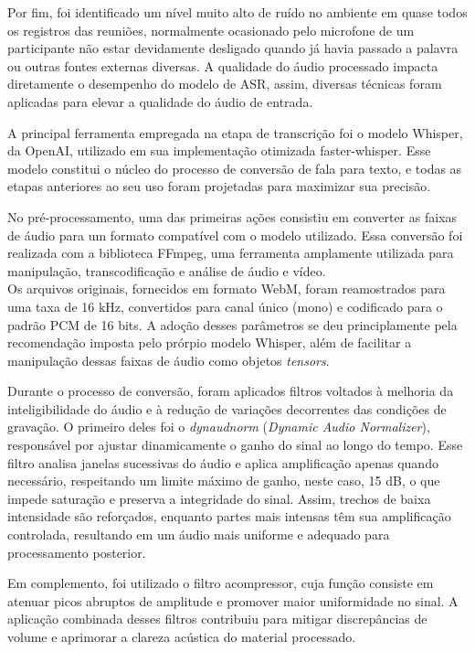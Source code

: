 Por fim, foi identificado um nível muito alto de ruído no ambiente em quase todos os registros das reuniões, normalmente ocasionado pelo microfone de um participante não estar devidamente desligado quando já havia passado a palavra ou outras fontes externas diversas. A qualidade do áudio processado impacta diretamente o desempenho do modelo de ASR, assim, diversas técnicas foram aplicadas para elevar a qualidade do áudio de entrada.

A principal ferramenta empregada na etapa de transcrição foi o modelo Whisper, da OpenAI, utilizado em sua implementação otimizada faster-whisper. Esse modelo constitui o núcleo do processo de conversão de fala para texto, e todas as etapas anteriores ao seu uso foram projetadas para maximizar sua precisão.

No pré-processamento, uma das primeiras ações consistiu em converter as faixas de áudio para um formato compatível com o modelo utilizado. Essa conversão foi realizada com a biblioteca FFmpeg, uma ferramenta amplamente utilizada para manipulação, transcodificação e análise de áudio e vídeo. \\ 

Os arquivos originais, fornecidos em formato WebM, foram reamostrados para uma taxa de 16 kHz, convertidos para canal único (mono) e codificado para o padrão PCM de 16 bits. A adoção desses parâmetros se deu principlamente pela recomendação imposta pelo prórpio modelo Whisper, além de facilitar a manipulação dessas faixas de áudio como objetos \textit{tensors}.

Durante o processo de conversão, foram aplicados filtros voltados à melhoria da inteligibilidade do áudio e à redução de variações decorrentes das condições de gravação. O primeiro deles foi o \textit{dynaudnorm} (\textit{Dynamic Audio Normalizer}), responsável por ajustar dinamicamente o ganho do sinal ao longo do tempo. Esse filtro analisa janelas sucessivas do áudio e aplica amplificação apenas quando necessário, respeitando um limite máximo de ganho, neste caso, 15 dB, o que impede saturação e preserva a integridade do sinal. Assim, trechos de baixa intensidade são reforçados, enquanto partes mais intensas têm sua amplificação controlada, resultando em um áudio mais uniforme e adequado para processamento posterior. 

Em complemento, foi utilizado o filtro acompressor, cuja função consiste em atenuar picos abruptos de amplitude e promover maior uniformidade no sinal. A aplicação combinada desses filtros contribuiu para mitigar discrepâncias de volume e aprimorar a clareza acústica do material processado.

